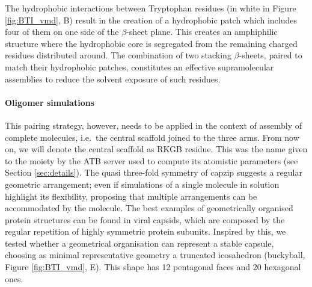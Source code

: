 The hydrophobic interactions between Tryptophan residues (in white in Figure \ref{fig:BTI_vmd}, B) result in the creation of a hydrophobic patch which includes four of them on one side of the $\beta$-sheet plane.
%
This creates an amphiphilic structure where the hydrophobic core is segregated from the remaining charged residues distributed around.
%
The combination of two stacking $\beta$-sheets, paired to match their hydrophobic patches, constitutes an effective supramolecular assemblies to reduce the solvent exposure of such residues.

\paragraph{Oligomer simulations} This pairing strategy, however, needs to be applied in the context of assembly of complete molecules, i.e.\ the central scaffold joined to the three arms. From now on, we will denote the central scaffold as RKGB residue. This was the name given to the moiety by the ATB server \citep{Malde2011, Koziara2014} used to compute its atomistic parameters (see Section \ref{sec:details}).
%
The quasi three-fold symmetry of capzip suggests a regular geometric arrangement; even if simulations of a single molecule in solution highlight its flexibility, proposing that multiple arrangements can be accommodated by the molecule.
%
The best examples of geometrically organised protein structures can be found in viral capsids, which are composed by the regular repetition of highly symmetric protein subunits.
%
Inspired by this, we tested whether a geometrical organisation can represent a stable capsule, choosing as minimal representative geometry a truncated icosahedron (buckyball, Figure \ref{fig:BTI_vmd}, E). This shape has 12 pentagonal faces and 20 hexagonal ones.

